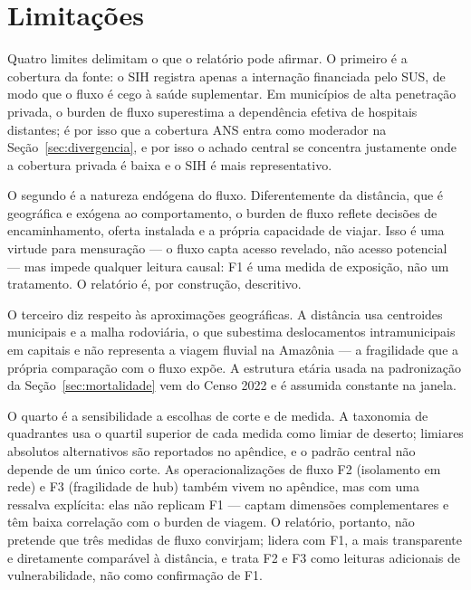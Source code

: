 
\section{Limitações}
\label{sec:limitacoes}

Quatro limites delimitam o que o relatório pode afirmar. O primeiro é a cobertura
da fonte: o SIH registra apenas a internação financiada pelo SUS, de modo que o
fluxo é cego à saúde suplementar. Em municípios de alta penetração privada, o
burden de fluxo superestima a dependência efetiva de hospitais distantes; é por
isso que a cobertura ANS entra como moderador na Seção~\ref{sec:divergencia}, e
por isso o achado central se concentra justamente onde a cobertura privada é
baixa e o SIH é mais representativo.

O segundo é a natureza endógena do fluxo. Diferentemente da distância, que é
geográfica e exógena ao comportamento, o burden de fluxo reflete decisões de
encaminhamento, oferta instalada e a própria capacidade de viajar. Isso é uma
virtude para mensuração --- o fluxo capta acesso revelado, não acesso potencial
--- mas impede qualquer leitura causal: F1 é uma medida de exposição, não um
tratamento. O relatório é, por construção, descritivo.

O terceiro diz respeito às aproximações geográficas. A distância usa centroides
municipais e a malha rodoviária, o que subestima deslocamentos intramunicipais
em capitais e não representa a viagem fluvial na Amazônia --- a fragilidade que a
própria comparação com o fluxo expõe. A estrutura etária usada na padronização da
Seção~\ref{sec:mortalidade} vem do Censo 2022 e é assumida constante na janela.

O quarto é a sensibilidade a escolhas de corte e de medida. A taxonomia de
quadrantes usa o quartil superior de cada medida como limiar de deserto;
limiares absolutos alternativos são reportados no apêndice, e o padrão central
não depende de um único corte. As operacionalizações de fluxo F2 (isolamento em
rede) e F3 (fragilidade de hub) também vivem no apêndice, mas com uma ressalva
explícita: elas não replicam F1 --- captam dimensões complementares e têm baixa
correlação com o burden de viagem. O relatório, portanto, não pretende que três
medidas de fluxo convirjam; lidera com F1, a mais transparente e diretamente
comparável à distância, e trata F2 e F3 como leituras adicionais de
vulnerabilidade, não como confirmação de F1.
